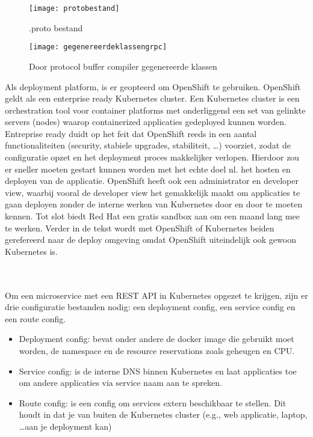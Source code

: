 \begin{figure}[ht]
    \centering
    \texttt{[image: protobestand]}
    \caption{.proto bestand}
    \label{fig:protobestand}
\end{figure}

\begin{figure}[ht]
    \centering
    \texttt{[image: gegenereerdeklassengrpc]}
    \caption{Door protocol buffer compiler gegenereerde klassen}
    \label{fig:gegenereerdeklassengrpc}
\end{figure}

Als deployment platform, is er geopteerd om OpenShift te gebruiken. OpenShift geldt als een enterprise ready Kubernetes cluster.
Een Kubernetes cluster is een orchestration tool voor container platforms met onderliggend een set van gelinkte servers (nodes)
waarop containerized applicaties gedeployed kunnen worden.
Entreprise ready duidt op het feit dat OpenShift reeds in een aantal functionaliteiten (security, stabiele upgrades, stabiliteit, \ldots)
voorziet, zodat de configuratie opzet en het deployment proces makkelijker verlopen.
Hierdoor zou er sneller moeten gestart kunnen worden met het echte doel nl. het hosten en deployen van de applicatie.
OpenShift heeft ook een administrator en developer view, waarbij vooral de developer view het gemakkelijk maakt om applicaties te gaan deployen
zonder de interne werken van Kubernetes door en door te moeten kennen.
Tot slot biedt Red Hat een gratis sandbox aan om een maand lang mee te werken. Verder in de tekst wordt met OpenShift of Kubernetes beiden gerefereerd naar de deploy omgeving
omdat OpenShift uiteindelijk ook gewoon Kubernetes is.\newline
~\autocite{redhatwhatiskubernetes}\\
~\autocite{redhatopenshiftkubernetes}\\
~\autocite{redhatopenshift}

Om een microservice met een REST API in Kubernetes opgezet te krijgen, zijn er drie configuratie bestanden nodig: een deployment config,
een service config en een route config.~\parencite{openshiftDeployment}
\begin{itemize}
    \item Deployment config: bevat onder andere de docker image die gebruikt moet worden, de namespace en de resource reservations zoals geheugen en CPU.
    \item Service config: is de interne DNS binnen Kubernetes en laat applicaties toe om andere applicaties via service naam aan te spreken.
    \item Route config: is een config om services extern beschikbaar te stellen. Dit houdt in dat je van buiten de Kubernetes cluster (e.g., web applicatie,
    laptop, \ldots aan je deployment kan)
\end{itemize}


